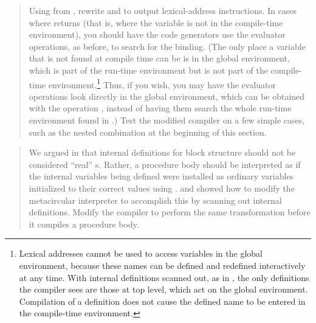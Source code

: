 \begin{quote}
 Using  from
, rewrite  and
 to output lexical-address instructions.  In cases
where  returns  (that is, where the
variable is not in the compile-time environment), you should have the code
generators use the evaluator operations, as before, to search for the binding.
(The only place a variable that is not found at compile time can be is in the
global environment, which is part of the run-time environment but is not part
of the compile-time environment.\footnote{Lexical addresses cannot be used to
access variables in the global environment, because these names can be defined
and redefined interactively at any time.  With internal definitions scanned
out, as in , the only definitions the compiler sees are
those at top level, which act on the global environment.  Compilation of a
definition does not cause the defined name to be entered in the compile-time
environment.}  Thus, if you wish, you may have the evaluator operations look
directly in the global environment, which can be obtained with the operation
, instead of having them search the whole
run-time environment found in .)  Test the modified compiler on a few
simple cases, such as the nested  combination at the beginning of
this section.
\end{quote}

\begin{quote}
 We argued in 
that internal definitions for block structure should not be considered ``real''
s.  Rather, a procedure body should be interpreted as if the
internal variables being defined were installed as ordinary 
variables initialized to their correct values using .
 and  showed how to modify the metacircular
interpreter to accomplish this by scanning out internal definitions.  Modify
the compiler to perform the same transformation before it compiles a procedure
body.
\end{quote}

